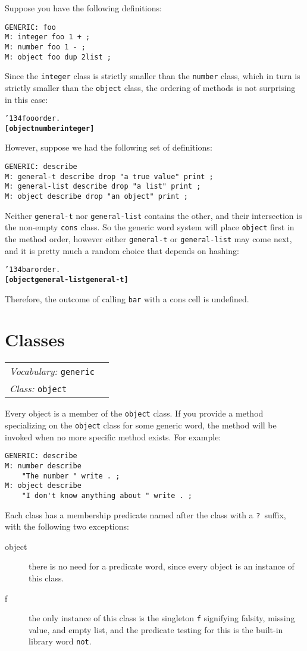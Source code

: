 \documentclass{book}
\newcommand{\bs}{\char'134}
\newcommand{\vocabulary}[1]{\emph{Vocabulary:} \texttt{#1}&\\}
\newcommand{\classword}[1]{\index{\texttt{#1}}\emph{Class:} \texttt{#1}&\\}
\newcommand{\wordtable}[1]{


\begin{tabularx}{12cm}{lX}
\hline
#1
\hline
\end{tabularx}

}
\begin{document}
Suppose you have the following definitions:
\begin{verbatim}
GENERIC: foo
M: integer foo 1 + ;
M: number foo 1 - ;
M: object foo dup 2list ;
\end{verbatim}
Since the \texttt{integer} class is strictly smaller than the \texttt{number} class, which in turn is strictly smaller than the \texttt{object} class, the ordering of methods is not surprising in this case:
\begin{alltt}
  \bs foo order .
\textbf{[ object number integer ]}
\end{alltt}
However, suppose we had the following set of definitions:
\begin{verbatim}
GENERIC: describe
M: general-t describe drop "a true value" print ;
M: general-list describe drop "a list" print ;
M: object describe drop "an object" print ;
\end{verbatim}
Neither \texttt{general-t} nor \texttt{general-list} contains the other, and their intersection is the non-empty \texttt{cons} class. So the generic word system will place \texttt{object} first in the method order, however either \texttt{general-t} or \texttt{general-list} may come next, and it is pretty much a random choice that depends on hashing:
\begin{alltt}
  \bs bar order .
\textbf{[ object general-list general-t ]}
\end{alltt}

Therefore, the outcome of calling \texttt{bar} with a cons cell is undefined.

\section{Classes}

\wordtable{
\vocabulary{generic}
\classword{object}
}
Every object is a member of the \texttt{object} class. If you provide a method specializing
on the \texttt{object} class for some generic word, the method will be
invoked when no more specific method exists. For example:
\begin{verbatim}
GENERIC: describe
M: number describe
    "The number " write . ;
M: object describe
    "I don't know anything about " write . ;
\end{verbatim}
Each class has a membership predicate named
after the class with a \texttt{?}~suffix, with the following two exceptions:
\begin{description}
\item[object] there is no need for a predicate word, since
every object is an instance of this class.
\item[f] the only instance of this class is the singleton
\texttt{f} signifying falsity, missing value, and empty list, and the predicate testing for this is the built-in library word \texttt{not}.
\end{description}
\end{document}
